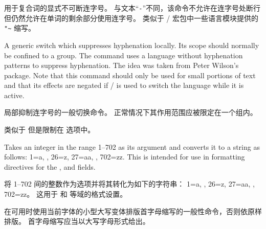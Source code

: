 \begin{ltxsyntax}


用于复合词的显式不可断连字号。
与文本“\texttt{-}”不同，该命令不允许在连字号处断行但仍然允许在单词的剩余部分使用连字号。
类似于 / 宏包中一些语言模块提供的 \verb+"~+ 缩写。


A generic switch which suppresses hyphenation locally. Its scope should normally be confined to a group. The command uses a language without hyphenation patterns to suppress hyphenation. The idea was taken from Peter Wilson's  package. Note that this command should only be used for small portions of text and that its effects are negated if / is used to switch the language while it is active.


局部抑制连字号的一般切换命令。
正常情况下其作用范围应被限定在一个组内。



类似于  但是限制在  选项中。


Takes an integer in the range 1--702 as its argument and converts it to a string as follows: 1=a, \textellipsis, 26=z, 27=aa, \textellipsis, 702=zz. This is intended for use in formatting directives for the ,  and  fields.


将 1--702 间的整数作为选项并将其转化为如下的字符串： 1=a, \textellipsis, 26=z, 27=aa, \textellipsis, 702=zz。
这用于  和  等域的格式设置。



在可用时使用当前字体的小型大写变体排版首字母缩写的一般性命令，否则依原样排版。
首字母缩写应当以大写字母形式给出。


\end{ltxsyntax}
